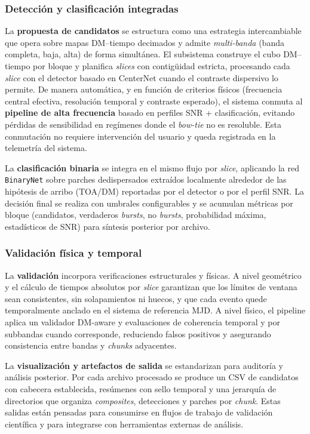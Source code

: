 \subsubsection{Detección y clasificación integradas}

La \textbf{propuesta de candidatos} se estructura como una estrategia intercambiable que opera sobre mapas DM--tiempo decimados y admite \emph{multi-banda} (banda completa, baja, alta) de forma simultánea. El subsistema construye el cubo DM--tiempo por bloque y planifica \emph{slices} con contigüidad estricta, procesando cada \emph{slice} con el detector basado en CenterNet cuando el contraste dispersivo lo permite. De manera automática, y en función de criterios físicos (frecuencia central efectiva, resolución temporal y contraste esperado), el sistema conmuta al \textbf{pipeline de alta frecuencia} basado en perfiles SNR + clasificación, evitando pérdidas de sensibilidad en regímenes donde el \emph{bow-tie} no es resoluble. Esta conmutación no requiere intervención del usuario y queda registrada en la telemetría del sistema.

La \textbf{clasificación binaria} se integra en el mismo flujo por \emph{slice}, aplicando la red \texttt{BinaryNet} sobre parches dedispersados extraídos localmente alrededor de las hipótesis de arribo (TOA/DM) reportadas por el detector o por el perfil SNR. La decisión final se realiza con umbrales configurables y se acumulan métricas por bloque (candidatos, verdaderos \emph{bursts}, no \emph{bursts}, probabilidad máxima, estadísticos de SNR) para síntesis posterior por archivo.

\subsubsection{Validación física y temporal}
La \textbf{validación} incorpora verificaciones estructurales y físicas. A nivel geométrico y el cálculo de tiempos absolutos por \emph{slice} garantizan que los límites de ventana sean consistentes, sin solapamientos ni huecos, y que cada evento quede temporalmente anclado en el sistema de referencia MJD. A nivel físico, el pipeline aplica un validador DM-aware y evaluaciones de coherencia temporal y por subbandas cuando corresponde, reduciendo falsos positivos y asegurando consistencia entre bandas y \emph{chunks} adyacentes.

La \textbf{visualización y artefactos de salida} se estandarizan para auditoría y análisis posterior. Por cada archivo procesado se produce un CSV de candidatos con cabecera establecida, resúmenes con sello temporal y una jerarquía de directorios que organiza \emph{composites}, detecciones y parches por \emph{chunk}. Estas salidas están pensadas para consumirse en flujos de trabajo de validación científica y para integrarse con herramientas externas de análisis.

